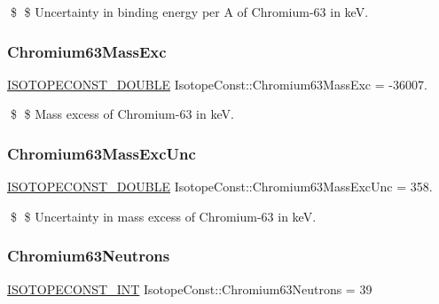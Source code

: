 \$ \$ Uncertainty in binding energy per A of Chromium-\/63 in keV. \mbox{\label{group___isotope_const-_chromium-_cr63_ga9fc9d907531606def92d2b1512520b0b}} 
\subsubsection{\texorpdfstring{Chromium63\+Mass\+Exc}{Chromium63MassExc}}
{\footnotesize\ttfamily \mbox{\hyperlink{group___isotope_const-_macros_ga8f45a7272ce02c0b4c65c44636ed719a}{I\+S\+O\+T\+O\+P\+E\+C\+O\+N\+S\+T\+\_\+\+D\+O\+U\+B\+LE}} Isotope\+Const\+::\+Chromium63\+Mass\+Exc = -\/36007.}

\$ \$ Mass excess of Chromium-\/63 in keV. \mbox{\label{group___isotope_const-_chromium-_cr63_gafd7c5731d6e9b90334cdc31b4fcd89ec}} 
\subsubsection{\texorpdfstring{Chromium63\+Mass\+Exc\+Unc}{Chromium63MassExcUnc}}
{\footnotesize\ttfamily \mbox{\hyperlink{group___isotope_const-_macros_ga8f45a7272ce02c0b4c65c44636ed719a}{I\+S\+O\+T\+O\+P\+E\+C\+O\+N\+S\+T\+\_\+\+D\+O\+U\+B\+LE}} Isotope\+Const\+::\+Chromium63\+Mass\+Exc\+Unc = 358.}

\$ \$ Uncertainty in mass excess of Chromium-\/63 in keV. \mbox{\label{group___isotope_const-_chromium-_cr63_ga3b75503127a905a13e79d3e9856dd439}} 
\subsubsection{\texorpdfstring{Chromium63\+Neutrons}{Chromium63Neutrons}}
{\footnotesize\ttfamily \mbox{\hyperlink{group___isotope_const-_macros_ga5f18360b3e99483a35c32d789e62621c}{I\+S\+O\+T\+O\+P\+E\+C\+O\+N\+S\+T\+\_\+\+I\+NT}} Isotope\+Const\+::\+Chromium63\+Neutrons = 39}

